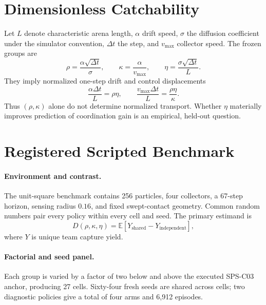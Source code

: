 \documentclass{article}
\newcommand{\rhoSNR}{\rho}
\newcommand{\kappaC}{\kappa}
\newcommand{\etaT}{\eta}
\begin{document}
\section{Dimensionless Catchability}

Let $L$ denote characteristic arena length, $\alpha$ drift speed, $\sigma$ the
diffusion coefficient under the simulator convention, $\Delta t$ the step, and
$v_{\max}$ collector speed. The frozen groups are
\begin{equation}
  \rhoSNR=\frac{\alpha\sqrt{\Delta t}}{\sigma},\qquad
  \kappaC=\frac{\alpha}{v_{\max}},\qquad
  \etaT=\frac{\sigma\sqrt{\Delta t}}{L}.
\end{equation}
They imply normalized one-step drift and control displacements
\begin{equation}
  \frac{\alpha\Delta t}{L}=\rhoSNR\etaT,
  \qquad
  \frac{v_{\max}\Delta t}{L}=\frac{\rhoSNR\etaT}{\kappaC}.
\end{equation}
Thus $(\rhoSNR,\kappaC)$ alone do not determine normalized transport. Whether
$\etaT$ materially improves prediction of coordination gain is an empirical,
held-out question.

\section{Registered Scripted Benchmark}

\paragraph{Environment and contrast.}
The unit-square benchmark contains 256 particles, four collectors, a 67-step
horizon, sensing radius $0.16$, and fixed swept-contact geometry. Common random
numbers pair every policy within every cell and seed. The primary estimand is
\begin{equation}
 D(\rhoSNR,\kappaC,\etaT)
 =\mathbb{E}[Y_{\mathrm{shared}}-Y_{\mathrm{independent}}],
\end{equation}
where $Y$ is unique team capture yield.

\paragraph{Factorial and seed panel.}
Each group is varied by a factor of two below and above the executed SPS-C03
anchor, producing 27 cells. Sixty-four fresh seeds are shared across cells; two
diagnostic policies give a total of four arms and 6,912 episodes.
\end{document}
